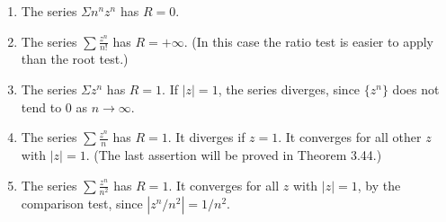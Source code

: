 \documentclass[../poma-notes.tex]{subfiles}
\begin{document}
\begin{examples}\mbox{}\par
  \begin{enumerate}[label=(\alph*)]
    \item The series $\Sigma n^n z^n$ has $R = 0$.
    \item The series $\sum\frac{z^n}{n!}$ has $R = +\infty$. (In this case the ratio test is easier to apply
          than the root test.)
    \item The series $\Sigma z^n$ has $R = 1$. If $|z|=1$, the series diverges, since $\{z^n\}$ does not
          tend to $0$ as $n\to\infty$.
    \item The series $\sum\frac{z^n}{n}$ has $R = 1$. It diverges if $z = 1$. It converges for all other $z$
          with $|z| = 1$. (The last assertion will be proved in Theorem 3.44.)
    \item The series $\sum\frac{z^n}{n^2}$ has $R = 1$. It converges for all $z$ with $|z|=1$, by the
          comparison test, since $|z^n/n^2| = 1/n^2$.
  \end{enumerate}
\end{examples}

\end{document}
